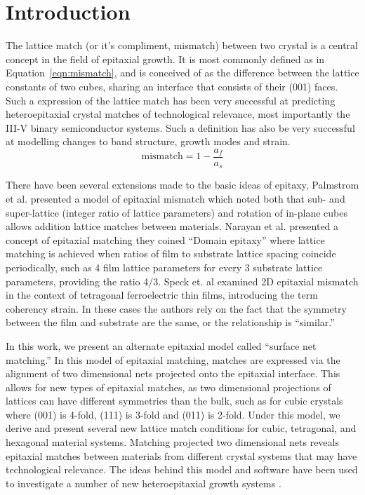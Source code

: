 \documentclass[final,5p,times,twocolumn]{elsarticle}
\begin{document}
\section{Introduction}
\label{Introduction}
The lattice match (or it’s compliment, mismatch) between two crystal is a central concept in the field of epitaxial growth. It is most commonly defined as in Equation~\ref{eqn:mismatch}, and is conceived of as the difference between the lattice constants of two cubes, sharing an interface that consists of their (001) faces. Such a expression of the lattice match has been very successful at predicting heteroepitaxial crystal matches of technological relevance, most importantly the III-V binary semiconductor systems. Such a definition has also be very successful at modelling changes to band structure\cite{Chuang1991}, growth modes\cite{Dunstan1997} and strain\cite{Dunstan1997}.
\begin{equation}
\text{mismatch} = 1 - \frac{a_f}{a_s} \label{eqn:mismatch}
\end{equation}

There have been several extensions made to the basic ideas of epitaxy, Palmstrom et al. \cite{Palmstrom1995} presented a model of epitaxial mismatch which noted both that sub- and super-lattice (integer ratio of lattice parameters) and rotation of in-plane cubes allows addition lattice matches between materials. Narayan et al. \cite{Narayan2003} presented a concept of epitaxial matching they coined “Domain epitaxy” where lattice matching is achieved when ratios of film to substrate lattice spacing coincide periodically, such as 4 film lattice parameters for every 3 substrate lattice parameters, providing the ratio 4/3. Speck et. al examined 2D epitaxial mismatch in the context of tetragonal ferroelectric thin films, introducing the term coherency strain\cite{Speck1995,Speck1994,Speck1994a}. In these cases the authors rely on the fact that the symmetry between the film and substrate are the same, or the relationship is “similar.”

In this work, we present an alternate epitaxial model called ``surface net matching.'' In this model of epitaxial matching, matches are expressed via the alignment of two dimensional nets projected onto the epitaxial interface. This allows for new types of epitaxial matches, as two dimensional projections of lattices can have different symmetries than the bulk, such as for cubic crystals where (001) is 4-fold, (111) is 3-fold and (011) is 2-fold. Under this model, we derive and present several new lattice match conditions for cubic, tetragonal, and hexagonal material systems. Matching projected two dimensional nets reveals epitaxial matches between materials from different crystal systems that may have technological relevance. The ideas behind this model and software have been used to investigate a number of new heteroepitaxial growth systems \cite{Devenyi2009,Neretina2006,Neretina2008b}.
\end{document}
